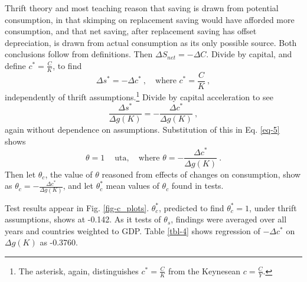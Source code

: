 \documentclass[a4paper,fleqn]{latex_styles/cas-sc}
\begin{document}
Thrift theory and most teaching reason that saving is drawn from potential consumption, in that skimping on replacement saving would have afforded more consumption, and that net saving, after replacement saving has offset depreciation, is drawn from actual consumption as its only possible source. Both conclusions follow from definitions. Then \(\Delta S_{net} = - \Delta C\). Divide by capital, and define \(c^*=\frac{C}{K}\), to find
%
\begin{equation}
\Delta s^* = - \Delta c^*\ ,\quad \text{where } c^*=\frac{C}{K}\ , \label{eq-6}
\end{equation}
%
independently of thrift assumptions.\footnote{The asterisk, again, distinguishes \(c^* = \frac{C}{K}\) from the Keynesean \(c = \frac{C}{Y}\).} Divide by capital acceleration to see
%
\begin{equation}
\frac{\Delta s^*}{\Delta g(K)} = -\frac{\Delta c^*}{\Delta g(K)}\ , \label{eq-7}
\end{equation}
%
again without dependence on assumptions. Substitution of this in Eq. \eqref{eq-5} shows
%
\begin{equation}
\theta = 1\ \quad \text{uta}, \quad \text{where } \theta = - \frac{\Delta c ^*}{\Delta g(K)}\ . \label{eq-8}
\end{equation}
%
Then let \(\theta_c\), the value of \(\theta\) reasoned from effects of changes on consumption, show as \(\theta_c = - \frac{\Delta c ^*}{\Delta g(K)}\), and let \(\theta_c^*\) mean values of \(\theta_c\) found in tests.

Test results appear in Fig. \eqref{fig-c_plots}. \(\theta^*_c\), predicted to find \(\theta_c^* = 1\), under thrift assumptions, shows at -0.142. As it tests of \(\theta_s\), findings were averaged over all years and countries weighted to GDP. Table \ref{tbl-4} shows regression of \(-\Delta c^*\) on \(\Delta g(K)\) as -0.3760.
\end{document}
